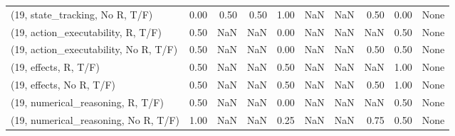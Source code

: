 \begin{table*}[h!]
\begin{adjustbox}{width=2\columnwidth,center}
\begin{tabular}{lrrr|rrr|rrr}
(19, state\_tracking, No R, T/F)       &                      0.00 &                  0.50 &                      0.50 &                          1.00 &                       NaN &                           NaN &                                   0.50 &                               0.00 &                                  None \\
(19, action\_executability, R, T/F)    &                      0.50 &                   NaN &                       NaN &                          0.00 &                       NaN &                           NaN &                                    NaN &                               0.50 &                                  None \\
(19, action\_executability, No R, T/F) &                      0.50 &                   NaN &                       NaN &                          0.00 &                       NaN &                           NaN &                                   0.50 &                               0.50 &                                  None \\
(19, effects, R, T/F)                 &                      0.50 &                   NaN &                       NaN &                          0.50 &                       NaN &                           NaN &                                    NaN &                               1.00 &                                  None \\
(19, effects, No R, T/F)              &                      0.50 &                   NaN &                       NaN &                          0.50 &                       NaN &                           NaN &                                   0.50 &                               1.00 &                                  None \\
(19, numerical\_reasoning, R, T/F)     &                      0.50 &                   NaN &                       NaN &                          0.00 &                       NaN &                           NaN &                                    NaN &                               0.50 &                                  None \\
(19, numerical\_reasoning, No R, T/F)  &                      1.00 &                   NaN &                       NaN &                          0.25 &                       NaN &                           NaN &                                   0.75 &                               0.50 &                                  None \\

\end{tabular}
\end{adjustbox}
\end{table*}
